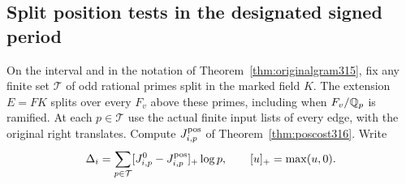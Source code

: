 \documentclass[a4paper,11pt]{article}
\theoremstyle{definition}
\theoremstyle{remark}
\numberwithin{equation}{section}
\begin{document}
\subsection{Split position tests in the designated signed period}\label{nav:IX-66}
On the interval and in the notation of
Theorem~\ref{thm:originalgram315}, fix any finite set
\(\mathcal T\) of odd rational primes split in the marked field
\(K\). The extension \(E=FK\) splits over every \(F_v\) above
these primes, including when \(F_v/\mathbb Q_p\) is ramified.
At each \(p\in\mathcal T\) use the actual finite input lists
of every edge, with the original right translates. Compute
\(J_{i,p}^{\rm pos}\) of Theorem~\ref{thm:poscost316}. Write
\[
     \Delta_i=\sum_{p\in\mathcal T}
               [J^0_{i,p}-J^{\rm pos}_{i,p}]_+\log p,
          \qquad [u]_+=\max(u,0).
\]
\end{document}
